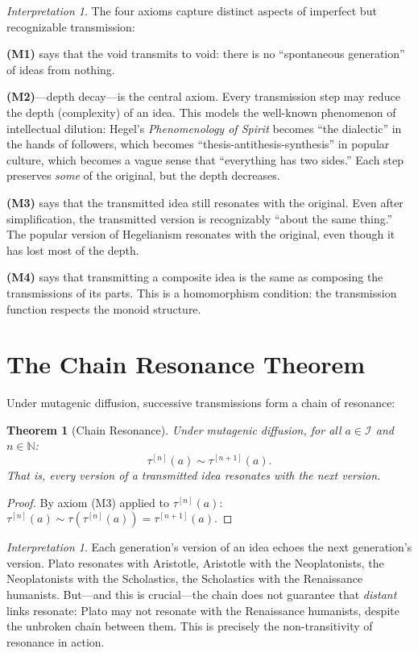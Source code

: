 \documentclass[11pt,openany]{book}
\theoremstyle{definition}
\theoremstyle{plain}
\newtheorem{theorem}[axiom]{Theorem}
\theoremstyle{remark}
\newtheorem{interpretation}[axiom]{Interpretation}
\newcommand{\IS}{\mathcal{I}}               %
\newcommand{\res}{\sim}                      %
\newcommand{\transmit}{\tau}                 %
\begin{document}
\begin{interpretation}
The four axioms capture distinct aspects of imperfect but recognizable transmission:

\textbf{(M1)} says that the void transmits to void: there is no ``spontaneous generation'' of ideas from nothing.

\textbf{(M2)}---depth decay---is the central axiom. Every transmission step may reduce the depth (complexity) of an idea. This models the well-known phenomenon of intellectual dilution: Hegel's \emph{Phenomenology of Spirit} becomes ``the dialectic'' in the hands of followers, which becomes ``thesis-antithesis-synthesis'' in popular culture, which becomes a vague sense that ``everything has two sides.'' Each step preserves \emph{some} of the original, but the depth decreases.

\textbf{(M3)} says that the transmitted idea still resonates with the original. Even after simplification, the transmitted version is recognizably ``about the same thing.'' The popular version of Hegelianism resonates with the original, even though it has lost most of the depth.

\textbf{(M4)} says that transmitting a composite idea is the same as composing the transmissions of its parts. This is a homomorphism condition: the transmission function respects the monoid structure.
\end{interpretation}

\section{The Chain Resonance Theorem}

Under mutagenic diffusion, successive transmissions form a chain of resonance:

\begin{theorem}[Chain Resonance]
\label{thm:chain-resonance}
Under mutagenic diffusion, for all $a \in \IS$ and $n \in \mathbb{N}$:
\[
\transmit^{[n]}(a) \res \transmit^{[n+1]}(a).
\]
That is, every version of a transmitted idea resonates with the next version.
\end{theorem}

\begin{proof}
By axiom (M3) applied to $\transmit^{[n]}(a)$: $\transmit^{[n]}(a) \res \transmit(\transmit^{[n]}(a)) = \transmit^{[n+1]}(a)$.
\end{proof}

\begin{interpretation}
Each generation's version of an idea echoes the next generation's version. Plato resonates with Aristotle, Aristotle with the Neoplatonists, the Neoplatonists with the Scholastics, the Scholastics with the Renaissance humanists. But---and this is crucial---the chain does not guarantee that \emph{distant} links resonate: Plato may not resonate with the Renaissance humanists, despite the unbroken chain between them. This is precisely the non-transitivity of resonance in action.
\end{interpretation}
\end{document}
